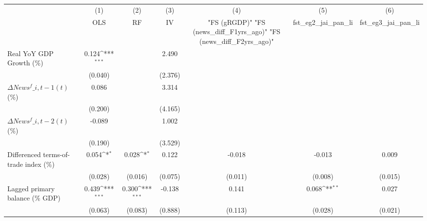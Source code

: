 {
\def\sym#1{\ifmmode^{#1}\else\(^{#1}\)\fi}
\begin{tabular}{l*{6}{c}}
\toprule
                    &\multicolumn{1}{c}{(1)}&\multicolumn{1}{c}{(2)}&\multicolumn{1}{c}{(3)}&\multicolumn{1}{c}{(4)}&\multicolumn{1}{c}{(5)}&\multicolumn{1}{c}{(6)}\\
                    &\multicolumn{1}{c}{OLS}&\multicolumn{1}{c}{RF}&\multicolumn{1}{c}{IV}&\multicolumn{1}{c}{ "FS (gRGDP)"  "FS (news\_diff\_F1yrs\_ago)"  "FS (news\_diff\_F2yrs\_ago)" }&\multicolumn{1}{c}{fst\_eg2\_jai\_pan\_li}&\multicolumn{1}{c}{fst\_eg3\_jai\_pan\_li}\\
\midrule
Real YoY GDP Growth (\%)&       0.124\sym{***}&                     &       2.490         &                     &                     &                     \\
                    &     (0.040)         &                     &     (2.376)         &                     &                     &                     \\
\addlinespace
$ \Delta News^f\_{i,t-1}(t)$ (\%)&       0.086         &                     &       3.314         &                     &                     &                     \\
                    &     (0.200)         &                     &     (4.165)         &                     &                     &                     \\
\addlinespace
$ \Delta News^f\_{i,t-2}(t)$ (\%)&      -0.089         &                     &       1.002         &                     &                     &                     \\
                    &     (0.190)         &                     &     (3.529)         &                     &                     &                     \\
\addlinespace
Differenced terms-of-trade index (\%)&       0.054\sym{*}  &       0.028\sym{*}  &       0.122         &      -0.018         &      -0.013         &       0.009         \\
                    &     (0.028)         &     (0.016)         &     (0.075)         &     (0.011)         &     (0.008)         &     (0.015)         \\
\addlinespace
Lagged primary balance (\% GDP)&       0.439\sym{***}&       0.300\sym{***}&      -0.138         &       0.141         &       0.068\sym{**} &       0.027         \\
                    &     (0.063)         &     (0.083)         &     (0.888)         &     (0.113)         &     (0.028)         &     (0.021)         \\

\end{tabular}}
